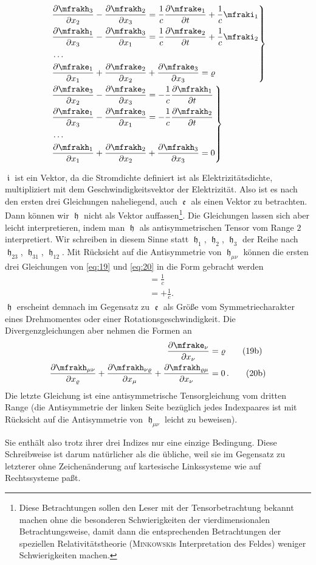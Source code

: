 \begin{align}
&\left.
\begin{aligned}
&\frpa{\mfrakh_3}{x_2} - \frpa{\mfrakh_2}{x_3} =
\frac{1}{c} \frpa{\mfrake_1}{t} + \frac{1}{c} \mfraki_1
\\
&\frpa{\mfrakh_1}{x_3} - \frpa{\mfrakh_3}{x_1} =
\frac{1}{c} \frpa{\mfrake_2}{t} + \frac{1}{c} \mfraki_2
\\
&\ldots
\\
&\frpa{\mfrake_1}{x_1} + \frpa{\mfrake_2}{x_2} + \frpa{\mfrake_3}{x_3} = \varrho
\end{aligned}
\right\}
\label{eq:19} \\
&\left.
\begin{aligned}
&\frpa{\mfrake_3}{x_2} - \frpa{\mfrake_2}{x_3} =
-\frac{1}{c} \frpa{\mfrakh_1}{t}
\\
&\frpa{\mfrake_1}{x_3} - \frpa{\mfrake_3}{x_1} =
-\frac{1}{c} \frpa{\mfrakh_2}{t}
\\
&\ldots
\\
&\frpa{\mfrakh_1}{x_1} + \frpa{\mfrakh_2}{x_2} + \frpa{\mfrakh_3}{x_3} = 0
\end{aligned}
\right\}
\label{eq:20}
\end{align}


$\mfraki$ ist ein Vektor, da die Stromdichte definiert ist als 
Elektrizitätsdichte, multipliziert mit dem Geschwindigkeitsvektor der 
Elektrizität. Also ist es nach den ersten drei Gleichungen naheliegend, 
auch $\mfrake$ als einen Vektor zu betrachten. Dann können wir $\mfrakh$ nicht 
als Vektor auffassen\footnote{Diese Betrachtungen sollen den Leser mit der 
Tensorbetrachtung bekannt machen ohne die besonderen Schwierigkeiten der 
vierdimensionalen Betrachtungsweise, damit dann die entsprechenden 
Betrachtungen der speziellen Relativitätstheorie (\textsc{Minkowski}s 
Interpretation des Feldes) weniger Schwierigkeiten machen.}. Die Gleichungen 
lassen sich aber leicht interpretieren, indem man $\mfrakh$ als 
antisymmetrischen Tensor vom Range $2$ interpretiert. Wir schreiben in diesem 
Sinne statt $\mfrakh_{1}$, $\mfrakh_{2}$, $\mfrakh_{3}$ der Reihe nach 
$\mfrakh_{23}$, $\mfrakh_{31}$, $\mfrakh_{12}$. Mit Rücksicht auf die 
Antisymmetrie von $\mfrakh_{\mu\nu}$ können die ersten drei Gleichungen von 
\eqref{eq:19} und \eqref{eq:20} in die Form gebracht werden
\begin{align}
	&= \frac{1}{c}
	\tag{19a} \\
	&= +\frac{1}{c}.
	\tag{20a}
\end{align}
$\mfrakh$ erscheint demnach im Gegensatz zu $\mfrake$ als Größe vom 
Symmetriecharakter eines Drehmomentes oder einer Rotationsgeschwindigkeit. Die 
Divergenzgleichungen aber nehmen die Formen an
\begin{align}
	\frpa{\mfrake_{\nu}}{x_{\nu}}&= \varrho
	\tag{19b} \\
	\frpa{\mfrakh_{\mu\nu}}{x_{\varrho}} +
	\frpa{\mfrakh_{\nu\varrho}}{x_{\mu}} +
	\frpa{\mfrakh_{\varrho\mu}}{x_{\nu}} &= 0\,.
	\tag{20b}
\end{align}
Die letzte Gleichung ist eine antisymmetrische Tensorgleichung vom dritten Range 
(die Antisymmetrie der linken Seite bezüglich jedes Indexpaares ist mit 
Rücksicht auf die Antisymmetrie von $\mfrakh_{\mu\nu}$ leicht zu beweisen).

Sie enthält also trotz ihrer drei Indizes nur eine einzige Bedingung. Diese 
Schreibweise ist darum natürlicher als die übliche, weil sie im Gegensatz zu 
letzterer ohne Zeichenänderung auf kartesische Linkssysteme wie auf 
Rechtssysteme paßt.